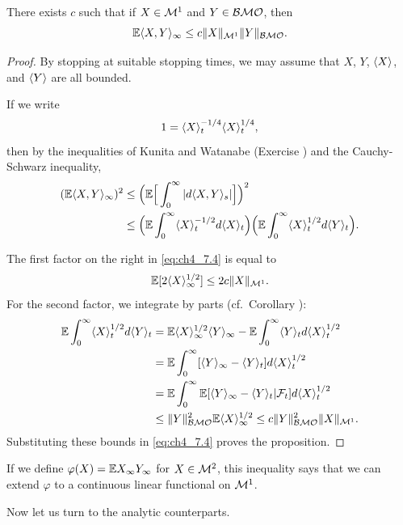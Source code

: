 \begin{proposition}\label{prop:ch4_7.4}
There exists $c$ such that if $X \in \mathcal{M}^1$ and $Y \in \mathcal{BMO}$, then
\[
    \mathbb{E}\langle X,Y \rangle_\infty \leq c\|X\|_{\mathcal{M}^1}\|Y\|_{\mathcal{BMO}}.
\]
\end{proposition}

\begin{proof}
By stopping at suitable stopping times, we may assume that $X$, $Y$, $\langle X \rangle$, and $\langle Y \rangle$ are all bounded.

If we write
\[
    1 = \langle X \rangle_t^{-1/4}\langle X \rangle_t^{1/4},
\]
then by the inequalities of Kunita and Watanabe (Exercise ) and the Cauchy-Schwarz inequality,
\begin{align}\label{eq:ch4_7.4}
    (\mathbb{E}\langle X,Y \rangle_\infty)^2 &\leq \Big(\mathbb{E}\Big[\int_0^\infty |d\langle X,Y \rangle_s|\Big]\Big)^2 \\
    &\leq \Big(\mathbb{E}\int_0^\infty \langle X \rangle_t^{-1/2}d\langle X \rangle_t\Big)\Big(\mathbb{E}\int_0^\infty \langle X \rangle_t^{1/2}d\langle Y \rangle_t\Big). \notag
\end{align}

The first factor on the right in \eqref{eq:ch4_7.4} is equal to
\[
    \mathbb{E}[2\langle X \rangle_\infty^{1/2}] \leq 2c\|X\|_{\mathcal{M}^1}.
\]
For the second factor, we integrate by parts (cf.\ Corollary ):
\begin{align*}
    \mathbb{E}\int_0^\infty \langle X \rangle_t^{1/2}d\langle Y \rangle_t &= \mathbb{E}\langle X \rangle_\infty^{1/2}\langle Y \rangle_\infty - \mathbb{E}\int_0^\infty \langle Y \rangle_t d\langle X \rangle_t^{1/2} \\
    &= \mathbb{E}\int_0^\infty [\langle Y \rangle_\infty - \langle Y \rangle_t] d\langle X \rangle_t^{1/2} \\
    &= \mathbb{E}\int_0^\infty \mathbb{E}[\langle Y \rangle_\infty - \langle Y \rangle_t| \mathcal{F}_t]d\langle X \rangle_t^{1/2} \\
    &\leq \|Y\|^2_{\mathcal{BMO}}\mathbb{E}\langle X \rangle_\infty^{1/2} \leq c\|Y\|^2_{\mathcal{BMO}}\|X\|_{\mathcal{M}^1}.
\end{align*}
Substituting these bounds in \eqref{eq:ch4_7.4} proves the proposition.
\end{proof}

If we define $\varphi(X) = \mathbb{E} X_\infty Y_\infty$ for $X \in \mathcal{M}^2$, this inequality says that we can extend $\varphi$ to a continuous linear functional on $\mathcal{M}^1$.


Now let us turn to the analytic counterparts.

